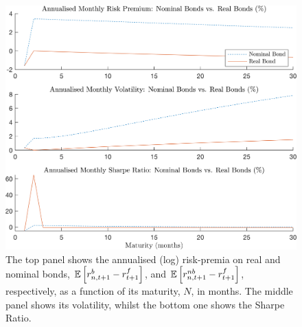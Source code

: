 \begin{figure}[h!]
	\centering
		\captionsetup{font=small, width=0.8\textwidth}
	\caption{The top panel shows the annualised (log)  risk-premia on  real and nominal bonds, $\mathbb{E}\left[r_{n,t+1}^{b}-r^f_{t+1}\right]$, and $\mathbb{E}\left[r_{n,t+1}^{nb}-r^f_{t+1}\right]$, respectively, as a function of its maturity, $N$, in months. The middle panel shows its volatility, whilst the bottom one shows the Sharpe Ratio.}\vspace{0.25cm}
	\includegraphics[scale=0.7]{secs/fig/realvsnominal.png}
\end{figure}